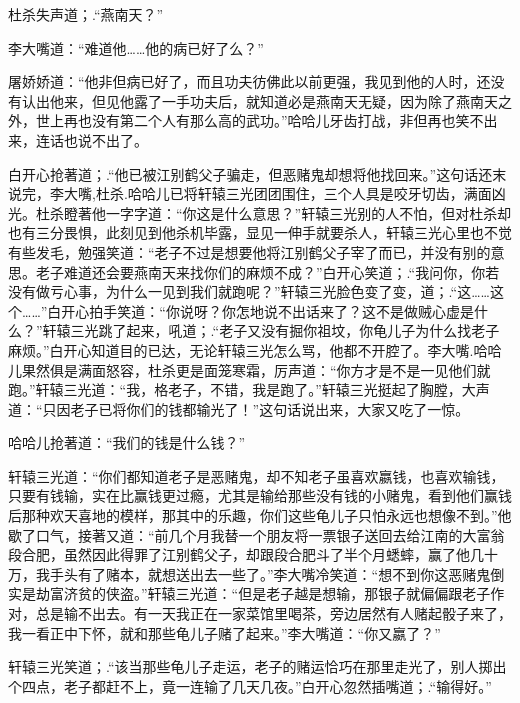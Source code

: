 \documentclass[12pt,oneside]{book}
\begin{document}
杜杀失声道；.``燕南天？''

李大嘴道：``难道他\ldots\ldots 他的病已好了么？''

屠娇娇道：``他非但病已好了，而且功夫彷佛此以前更强，我见到他的人时，还没有认出他来，但见他露了一手功夫后，就知道必是燕南天无疑，因为除了燕南天之外，世上再也没有第二个人有那么高的武功。''哈哈儿牙齿打战，非但再也笑不出来，连话也说不出了。

白开心抢著道；.``他已被江别鹤父子骗走，但恶赌鬼却想将他找回来。''这句话还末说完，李大嘴,杜杀.哈哈儿已将轩辕三光团团围住，三个人具是咬牙切齿，满面凶光。杜杀瞪著他一字字道：``你这是什么意思？''轩辕三光别的人不怕，但对杜杀却也有三分畏惧，此刻见到他杀机毕露，显见一伸手就要杀人，轩辕三光心里也不觉有些发毛，勉强笑道：``老子不过是想要他将江别鹤父子宰了而已，并没有别的意思。老子难道还会要燕南天来找你们的麻烦不成？''白开心笑道；.``我问你，你若没有做亏心事，为什么一见到我们就跑呢？''轩辕三光脸色变了变，道；.``这\ldots\ldots 这个\ldots\ldots{}''白开心拍手笑道：``你说呀？你怎地说不出话来了？这不是做贼心虚是什么？''轩辕三光跳了起来，吼道；.``老子又没有掘你祖坟，你龟儿子为什么找老子麻烦。''白开心知道目的已达，无论轩辕三光怎么骂，他都不开腔了。李大嘴.哈哈儿果然俱是满面怒容，杜杀更是面笼寒霜，厉声道：``你方才是不是一见他们就跑。''轩辕三光道：``我，格老子，不错，我是跑了。''轩辕三光挺起了胸膛，大声道：``只因老子已将你们的钱都输光了！''这句话说出来，大家又吃了一惊。

哈哈儿抢著道：``我们的钱是什么钱？''

轩辕三光道：``你们都知道老子是恶赌鬼，却不知老子虽喜欢嬴钱，也喜欢输钱，只要有钱输，实在比赢钱更过瘾，尤其是输给那些没有钱的小赌鬼，看到他们赢钱后那种欢天喜地的模样，那其中的乐趣，你们这些龟儿子只怕永远也想像不到。''他歇了口气，接著又道：``前几个月我替一个朋友将一票银子送回去给江南的大富翁段合肥，虽然因此得罪了江别鹤父子，却跟段合肥斗了半个月蟋蟀，赢了他几十万，我手头有了赌本，就想送出去一些了。''李大嘴冷笑道：``想不到你这恶赌鬼倒实是劫富济贫的侠盗。''轩辕三光道：``但是老子越是想输，那银子就偏偏跟老子作对，总是输不出去。有一天我正在一家菜馆里喝茶，旁边居然有人赌起骰子来了，我一看正中下怀，就和那些龟儿子赌了起来。''李大嘴道：``你又嬴了？''

轩辕三光笑道；.``该当那些龟儿子走运，老子的赌运恰巧在那里走光了，别人掷出个四点，老子都赶不上，竟一连输了几天几夜。''白开心忽然插嘴道；.``输得好。''
\end{document}
